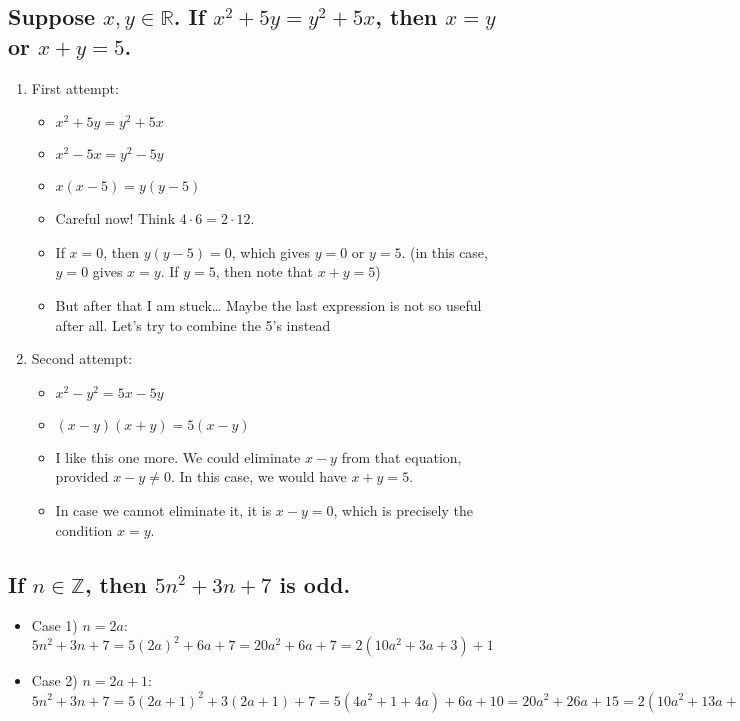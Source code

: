 \documentclass[11pt, oneside]{amsart}
\begin{document}
\subsection{Suppose \(x, y \in \mathbb{R}\).  If \(x^2+5y = y^2+5x\), then \(x=y\) or \(x+y=5\).}
\label{sec:org10e76c5}
\begin{enumerate}
\item First attempt:
\label{sec:org1d91685}
\begin{itemize}
\item \(x^2+5y = y^2+5x\)
\item \(x^2-5x = y^2-5y\)
\item \(x(x-5) = y(y-5)\)
\item Careful now!  Think \(4 \cdot 6 = 2 \cdot 12\).
\item If \(x=0\), then \(y(y-5)=0\), which gives \(y=0\) or \(y=5\).  (in this case, \(y=0\) gives \(x=y\).  If \(y=5\), then note that \(x+y=5\))
\item But after that I am stuck\ldots{} Maybe the last expression is not so useful after all.  Let's try to combine the 5's instead
\end{itemize}
\item Second attempt:
\label{sec:orge18e8fb}
\begin{itemize}
\item \(x^2-y^2 = 5x-5y\)
\item \((x-y)(x+y)=5(x-y)\)
\item I like this one more. We could eliminate \(x-y\) from that equation, provided \(x-y \neq 0\).  In this case, we would have \(x+y=5\).
\item In case we cannot eliminate it, it is \(x-y=0\), which is precisely the condition \(x=y\).
\end{itemize}
\end{enumerate}

\subsection{If \(n \in \mathbb{Z}\), then \(5n^2+3n+7\) is odd.}
\label{sec:orgbf6787e}
\begin{itemize}
\item Case 1) \(n=2a\): \(5n^2+3n+7 = 5(2a)^2+6a+7=20a^2+6a+7 = 2(10a^2+3a+3)+1\)
\item Case 2) \(n=2a+1\): \(5n^2+3n+7 = 5(2a+1)^2+3(2a+1)+7 = 5(4a^2+1+4a)+6a+10 = 20a^2+26a+15 =2(10a^2+13a+7)+1\)
\end{itemize}
\end{document}
